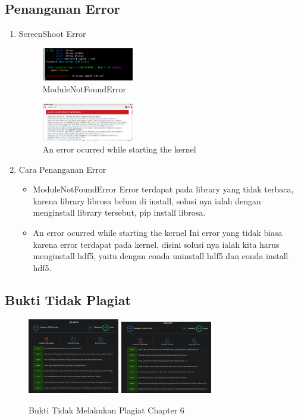 \subsection{Penanganan Error}
\begin{enumerate}
	\item ScreenShoot Error
	\begin{figure}[H]
		\includegraphics[width=4cm]{figures/1174015/6/error/1.PNG}
		\centering
		\caption{ModuleNotFoundError}
	\end{figure}

	\begin{figure}[H]
		\includegraphics[width=4cm]{figures/1174015/6/error/2.PNG}
		\centering
		\caption{An error ocurred while starting the kernel}
	\end{figure}

	\item Cara Penanganan Error
	\begin{itemize}
		\item ModuleNotFoundError
		\hfill\break
		Error terdapat pada library yang tidak terbaca, karena library librosa belum di install, solusi nya ialah dengan menginstall library tersebut, pip install librosa.
		\item An error ocurred while starting the kernel
		\hfill\break
		Ini error yang tidak biasa karena error terdapat pada kernel, disini solusi nya ialah kita harus menginstall hdf5, yaitu dengan conda uninstall hdf5 dan conda install hdf5.
	\end{itemize}
\end{enumerate}

\subsection{Bukti Tidak Plagiat}
\begin{figure}[H]
\centering
	\includegraphics[width=4cm]{figures/1174015/6/buktiplagiat/1.PNG}
	\includegraphics[width=4cm]{figures/1174015/6/buktiplagiat/2.PNG}
	\caption{Bukti Tidak Melakukan Plagiat Chapter 6}
\end{figure}

